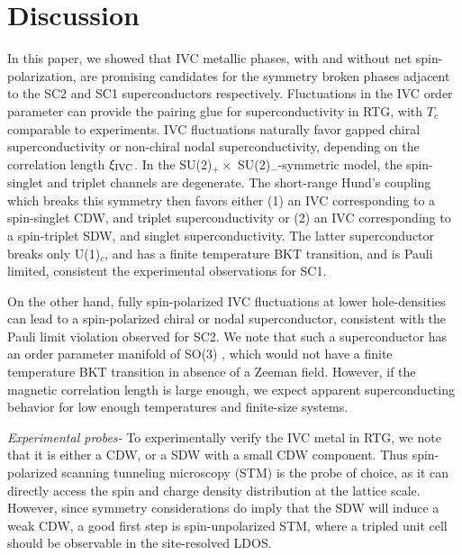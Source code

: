 \documentclass[aps,pra,twocolumn,superscriptaddress,10pt,article,nofootinbib,showpacs,longbibliography]{revtex4-1}
\begin{document}
\section{Discussion}
\label{sec:Outlook}

In this paper, we showed that  IVC metallic phases, with and without net spin-polarization, are promising candidates for the symmetry broken phases adjacent to the SC2 and SC1 superconductors respectively.
Fluctuations in the IVC order parameter can provide the pairing glue for superconductivity in RTG, with $T_c$ comparable to experiments.
IVC fluctuations naturally favor gapped chiral superconductivity or non-chiral nodal superconductivity, depending on the correlation length $\xi_{\rm IVC}$.
In the SU(2)$_+ \times$ SU(2)$_-$-symmetric model, the spin-singlet and triplet channels are degenerate. 
The short-range Hund's coupling which breaks this symmetry then favors either (1) an IVC corresponding to a spin-singlet CDW, and triplet superconductivity or (2)  an IVC corresponding to a spin-triplet SDW, and singlet superconductivity. 
The latter  superconductor breaks only U(1)$_c$, and has a finite temperature BKT transition, and is Pauli limited, consistent the experimental observations for SC1. 

On the other hand, fully  spin-polarized IVC fluctuations at lower hole-densities can lead to a spin-polarized chiral or nodal superconductor, consistent with the Pauli limit violation observed for SC2. 
We note that such a superconductor has an order parameter manifold of SO(3) \cite{Mukerjee2006,LS2021,Eyal}, which would not have a finite temperature BKT transition in absence of a Zeeman field.
However, if the magnetic correlation length is large enough, we expect apparent superconducting behavior for low enough temperatures and finite-size systems.

\emph{Experimental probes-}
To experimentally verify the IVC metal in RTG, we note that it is either  a CDW, or a SDW with a small CDW component. 
Thus spin-polarized scanning tunneling microscopy (STM) \cite{SPSTM_RMP,SPSTM_ARMR} is the probe of choice, as it can directly access the spin and charge density distribution at the lattice scale.
However, since  symmetry considerations do imply that the SDW  will induce a weak CDW, a good first step is spin-unpolarized STM,  where a tripled unit cell should be observable in the site-resolved LDOS. 
\end{document}
